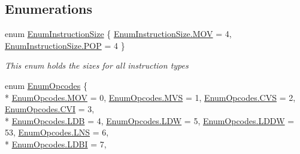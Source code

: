 \subsection*{Enumerations}
\begin{DoxyCompactItemize}
\item 
enum \hyperlink{namespace_c_p_u___o_s___simulator_1_1_c_p_u_af322082b9b46482202165fb547c052a7}{Enum\+Instruction\+Size} \{ \hyperlink{namespace_c_p_u___o_s___simulator_1_1_c_p_u_af322082b9b46482202165fb547c052a7a17b32100aef1fc19670be7fd58bc85df}{Enum\+Instruction\+Size.\+M\+O\+V} = 4, 
\hyperlink{namespace_c_p_u___o_s___simulator_1_1_c_p_u_af322082b9b46482202165fb547c052a7aefdb39a4c7286afcecf0e8a7435fce6a}{Enum\+Instruction\+Size.\+P\+O\+P} = 4
 \}\begin{DoxyCompactList}\small\item\em This enum holds the sizes for all instruction types \end{DoxyCompactList}
\item 
enum \hyperlink{namespace_c_p_u___o_s___simulator_1_1_c_p_u_ac29c87bff87ad404c953b2581024043e}{Enum\+Opcodes} \{ \\*
\hyperlink{namespace_c_p_u___o_s___simulator_1_1_c_p_u_ac29c87bff87ad404c953b2581024043ea17b32100aef1fc19670be7fd58bc85df}{Enum\+Opcodes.\+M\+O\+V} = 0, 
\hyperlink{namespace_c_p_u___o_s___simulator_1_1_c_p_u_ac29c87bff87ad404c953b2581024043ea69ad7d37a807081169292099cdec3d83}{Enum\+Opcodes.\+M\+V\+S} = 1, 
\hyperlink{namespace_c_p_u___o_s___simulator_1_1_c_p_u_ac29c87bff87ad404c953b2581024043ea51332b8fec73c1f1aeb5259d61fabb3a}{Enum\+Opcodes.\+C\+V\+S} = 2, 
\hyperlink{namespace_c_p_u___o_s___simulator_1_1_c_p_u_ac29c87bff87ad404c953b2581024043ead66368fbbeff252bb773b5b0837371b6}{Enum\+Opcodes.\+C\+V\+I} = 3, 
\\*
\hyperlink{namespace_c_p_u___o_s___simulator_1_1_c_p_u_ac29c87bff87ad404c953b2581024043ea9630d206d80399f359e9ba03ce049143}{Enum\+Opcodes.\+L\+D\+B} = 4, 
\hyperlink{namespace_c_p_u___o_s___simulator_1_1_c_p_u_ac29c87bff87ad404c953b2581024043eac3403948896175c390e1c6cf55d56e00}{Enum\+Opcodes.\+L\+D\+W} = 5, 
\hyperlink{namespace_c_p_u___o_s___simulator_1_1_c_p_u_ac29c87bff87ad404c953b2581024043ea9bb0ce14967fbf9a41706e3c2b39f2c0}{Enum\+Opcodes.\+L\+D\+D\+W} = 53, 
\hyperlink{namespace_c_p_u___o_s___simulator_1_1_c_p_u_ac29c87bff87ad404c953b2581024043eaa44cb7d46990322950d0f4b7369de7fa}{Enum\+Opcodes.\+L\+N\+S} = 6, 
\\*
\hyperlink{namespace_c_p_u___o_s___simulator_1_1_c_p_u_ac29c87bff87ad404c953b2581024043ea8d7bae8c9bed76910d021d8afe706299}{Enum\+Opcodes.\+L\+D\+B\+I} = 7, 

\end{DoxyCompactItemize}
